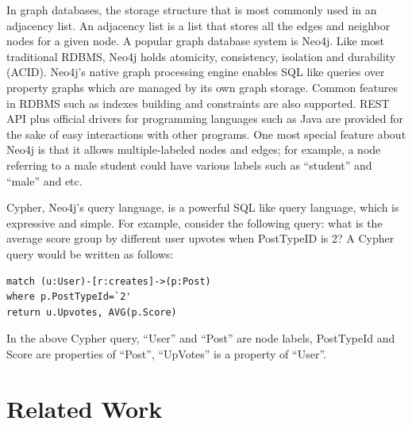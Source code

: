 In graph databases, the storage structure that is most commonly used in an adjacency list. An adjacency list is a list that stores all the edges and neighbor nodes for a given node. A popular graph database system is Neo4j. Like most traditional RDBMS, Neo4j holds atomicity, consistency, isolation and durability (ACID). Neo4j's native graph processing engine enables SQL like queries over property graphs which are managed by its own graph storage. Common features in RDBMS such as indexes building and constraints are also supported. REST API plus official drivers for programming languages such as Java are provided for the sake of easy interactions with other programs. One most special feature about Neo4j is that it allows multiple-labeled nodes and edges; for example, a node referring to a male student could have various labels such as ``student'' and ``male'' and etc.

Cypher, Neo4j's query language, is a powerful SQL like query language, which is expressive and simple. For example, consider the following query: what is the average score group by different user upvotes when PostTypeID is 2? A Cypher query would be written as follows:

\begin{verbatim}
match (u:User)-[r:creates]->(p:Post)
where p.PostTypeId=`2'
return u.Upvotes, AVG(p.Score)
\end{verbatim}

In the above Cypher query, ``User'' and ``Post'' are node labels, PostTypeId and Score are properties of ``Post'', ``UpVotes'' is a property of ``User''.


%


\section{Related Work}



